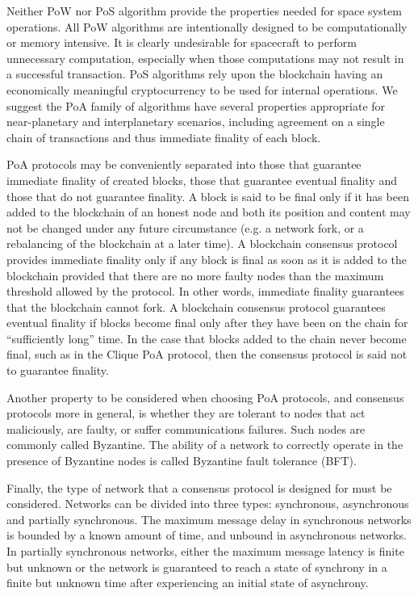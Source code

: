 \documentclass[]{aiaa-tc}%
\begin{document}
Neither PoW nor PoS algorithm provide the properties needed for space system operations. All PoW algorithms are intentionally designed to be computationally or memory intensive. It is clearly undesirable for spacecraft to perform unnecessary computation, especially when those computations may not result in a successful transaction. PoS algorithms rely upon the blockchain having an economically meaningful cryptocurrency to be used for internal operations. We suggest the PoA family of algorithms have several properties appropriate for near-planetary and interplanetary scenarios, including agreement on a single chain of transactions and thus immediate finality of each block.

PoA protocols may be conveniently separated into those that guarantee immediate finality of created blocks, those that guarantee eventual finality and those that do not guarantee finality. A block is said to be final only if it has been added to the blockchain of an honest node and both its position and content may not be changed under any future circumstance (e.g. a network fork, or a rebalancing of the blockchain at a later time). A blockchain consensus protocol provides immediate finality only if any block is final as soon as it is added to the blockchain provided that there are no more faulty nodes than the maximum threshold allowed by the protocol. In other words, immediate finality guarantees that the blockchain cannot fork. A blockchain consensus protocol guarantees eventual finality if blocks become final only after they have been on the chain for ``sufficiently long'' time. In the case that blocks added to the chain never become final, such as in the Clique PoA protocol\cite{Szilagyi-Clique}, then the consensus protocol is said not to guarantee finality.

Another property to be considered when choosing PoA protocols, and consensus protocols more in general, is whether they are tolerant to nodes that 
 act maliciously, 
are faulty, or suffer communications failures. 
 Such nodes are commonly called Byzantine\cite{lamport1982byzantine}. The ability of a network to correctly operate in the presence of Byzantine nodes is called Byzantine fault tolerance (BFT).

Finally, the type of network that a consensus protocol is designed for must be considered. Networks can be divided into three types: synchronous, asynchronous and partially synchronous\cite{dwork1988consensus}. The maximum message delay in synchronous networks is bounded by a known amount of time, and unbound in asynchronous networks. In partially synchronous networks, either the maximum message latency is finite but unknown or the network is guaranteed to reach a state of synchrony in a finite but unknown time after experiencing an initial state of asynchrony.
\end{document}
